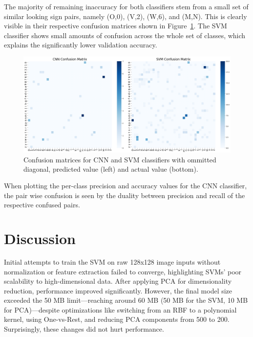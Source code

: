 \documentclass[a4, 10 pt, conference]{ieeeconf}  %
\begin{document}
\vspace{-1.5em}

The majority of remaining inaccuracy for both classifiers stem from a small set of similar
looking sign pairs, namely (O,0), (V,2), (W,6), and (M,N). This is clearly visible
in their respective confusion matrices shown in Figure~\ref{fig:cm}. The SVM
classifier shows small amounts of confusion across the whole set of classes,
which explains the significantly lower validation accuracy.

\begin{figure}[htb]
  \centering
  \includegraphics[width=\linewidth]{../images/cm_comparison.png}
  \caption{Confusion matrices for CNN and SVM classifiers with ommitted diagonal, predicted value (left) and actual value (bottom).}
  \label{fig:cm}
\end{figure}

When plotting the per-class precision and accuracy values for the CNN classifier,
the pair wise confusion is seen by the duality between precision and recall of the
respective confused pairs.

\section{Discussion}
\label{sec:discuss}

Initial attempts to train the SVM on raw 128x128 image inputs without normalization or feature extraction failed to converge, highlighting SVMs' poor scalability to high-dimensional data. After applying PCA for dimensionality reduction, performance improved significantly. However, the final model size exceeded the 50 MB limit—reaching around 60 MB (50 MB for the SVM, 10 MB for PCA)—despite optimizations like switching from an RBF to a polynomial kernel, using One-vs-Rest, and reducing PCA components from 500 to 200. Surprisingly, these changes did not hurt performance.
\end{document}
